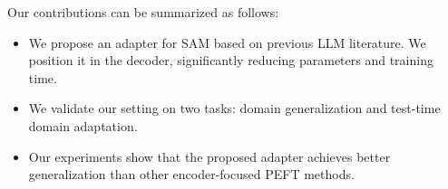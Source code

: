 Our contributions can be summarized as follows:
\begin{itemize}
    \item We propose an adapter for SAM based on previous LLM literature. We position it in the decoder, significantly reducing parameters and training time.
    \item We validate our setting on two tasks: domain generalization and test-time domain adaptation. 
    \item Our experiments show that the proposed adapter achieves better generalization than other encoder-focused PEFT methods. 
\end{itemize}


